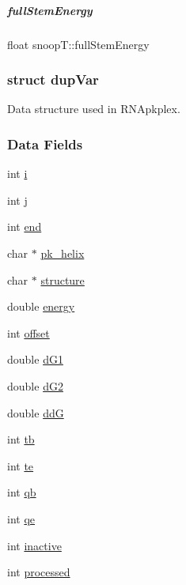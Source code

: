 \mbox{\label{group__data__structures_af1fa0deae33e51ccf529d9b5017e146d}} 
\subparagraph{\texorpdfstring{full\+Stem\+Energy}{fullStemEnergy}}
{\footnotesize\ttfamily float snoop\+T\+::full\+Stem\+Energy}

\label{structdup_var}
\subsubsection{struct dup\+Var}
Data structure used in R\+N\+Apkplex. \subsubsection*{Data Fields}
\begin{DoxyCompactItemize}
\item 
int \mbox{\hyperlink{group__data__structures_a50ea99c4653c6f2c7e1c60aa30610fd8}{i}}
\item 
int \mbox{\hyperlink{group__data__structures_a55013be08c4d13e3e0dbac43227d76da}{j}}
\item 
int \mbox{\hyperlink{group__data__structures_aaa663742abecd8e37d062d8c185bd9c5}{end}}
\item 
char $\ast$ \mbox{\hyperlink{group__data__structures_a834790e6ae9c6babd3b03126ae161908}{pk\+\_\+helix}}
\item 
char $\ast$ \mbox{\hyperlink{group__data__structures_ac21289fea0518e2db4b50cff0368a4c7}{structure}}
\item 
double \mbox{\hyperlink{group__data__structures_a58aa3018ab0d069ee3b83e00c7f6db8a}{energy}}
\item 
int \mbox{\hyperlink{group__data__structures_a18c9e7a500f7701d857f5265d0f33145}{offset}}
\item 
double \mbox{\hyperlink{group__data__structures_aeb799a6f6873dc4a7a438ff67804a123}{d\+G1}}
\item 
double \mbox{\hyperlink{group__data__structures_a3a9f5b2d5e8cc7fa0b070311f0f360fb}{d\+G2}}
\item 
double \mbox{\hyperlink{group__data__structures_aaeb77285d40c59400d59a6698d737f32}{ddG}}
\item 
int \mbox{\hyperlink{group__data__structures_a157631c8507bed5cdc4f4760ab7d24a0}{tb}}
\item 
int \mbox{\hyperlink{group__data__structures_ae4b56b08a491a0ec03eba3f4b8120b5c}{te}}
\item 
int \mbox{\hyperlink{group__data__structures_a148569653fe6e9f8bc92f34e1da1bcfb}{qb}}
\item 
int \mbox{\hyperlink{group__data__structures_a9a3b61653ce27869d66d9a20e7774ce0}{qe}}
\item 
int \mbox{\hyperlink{group__data__structures_a3b15616278d5a95fbf1085efa8ee5f26}{inactive}}
\item 
int \mbox{\hyperlink{group__data__structures_a18db66f6558422be96063f8e42ccb944}{processed}}
\end{DoxyCompactItemize}


